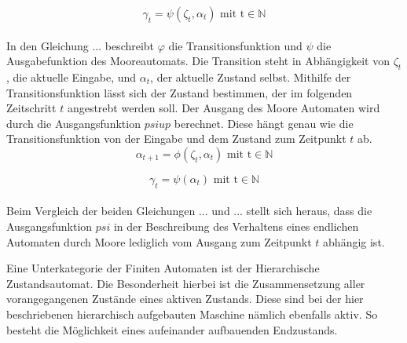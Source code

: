 	\begin{equation}
		\gamma_t=\psi(\zeta_t,\alpha_t)\text{    mit    t}\in\mathbb{N}
		\label{eq: transferfct}
	\end{equation}
	\\
	In den Gleichung ... beschreibt $\varphi$ die Transitionsfunktion und $\psi$ die Ausgabefunktion des Mooreautomats. Die Transition steht in Abhängigkeit von $\zeta_t $, die aktuelle Eingabe, und $\alpha_t$, der aktuelle Zustand selbst. Mithilfe der Transitionsfunktion lässt sich der Zustand bestimmen, der im folgenden Zeitschritt $t$ angestrebt werden soll. Der Ausgang des Moore Automaten wird durch die Ausgangsfunktion $psiup$ berechnet. Diese hängt genau wie die Transitionsfunktion von der Eingabe und dem Zustand zum Zeitpunkt $t$ ab. \\
	
	\begin{equation}
		\alpha_{t+1}=\phi(\zeta_t,\alpha_t)\text{    mit    t}\in\mathbb{N}
		\label{eq: transferfct}
	\end{equation}
	
	\begin{equation}
		\gamma_t=\psi(\alpha_t)\text{    mit    t}\in\mathbb{N}
		\label{eq: transferfct}
	\end{equation}
	\\
	
	Beim Vergleich der beiden Gleichungen ... und ... stellt sich heraus, dass die Ausgangsfunktion $psi$ in der Beschreibung des Verhaltens eines endlichen Automaten durch Moore lediglich vom Ausgang zum Zeitpunkt $t$ abhängig ist.
	
	Eine Unterkategorie der Finiten Automaten ist der Hierarchische Zustandsautomat. Die Besonderheit hierbei ist die Zusammensetzung aller vorangegangenen Zustände eines aktiven Zustands. Diese sind bei der hier beschriebenen hierarchisch aufgebauten Maschine nämlich ebenfalls aktiv. So besteht die Möglichkeit eines aufeinander aufbauenden Endzustands. 
	
	
		
		
